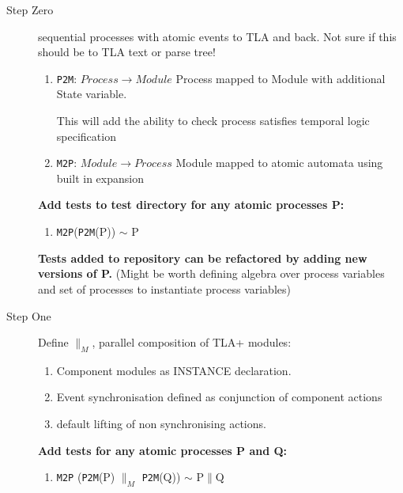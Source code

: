 \documentclass[]{article}
\begin{document}
 \begin{description}
 \item[Step Zero] sequential processes with atomic events to TLA and back. Not sure if this should be to TLA text or parse tree!
 
 \begin{enumerate}
 
 \item \verb|P2M|: $Process \rightarrow Module$ Process mapped to Module with additional State variable. 
 
 This will add the ability to check process satisfies temporal logic specification 
 
 \item \verb|M2P|: $Module \rightarrow Process $ Module mapped to atomic automata using built in expansion
 

 \end{enumerate}
  
   {\bf Add tests to test directory for any atomic processes P:    
    \begin{enumerate}
    \item  \verb|M2P|(\verb|P2M|(P)) $\sim$ P
    \end{enumerate}  
    }
    {\bf Tests added to repository can be refactored by adding new versions of P.} (Might be worth defining algebra over process variables and set of processes to instantiate process variables)   
    
    \item[Step One] Define $\parallel_M$, parallel composition of TLA+ modules:
     
     \begin{enumerate}
     
     \item  Component modules as INSTANCE declaration.  
     
     \item Event synchronisation defined as conjunction of component actions
     
     \item default lifting of non synchronising actions.
     
     
    
     \end{enumerate}
      
       {\bf Add tests for any atomic processes P and Q:    
        \begin{enumerate}
        \item  \verb|M2P| (\verb|P2M|(P) $\parallel_M$ \verb|P2M|(Q)) $\sim$ P$\parallel$Q
        \end{enumerate}  
        }
          

\end{description}
\end{document}
